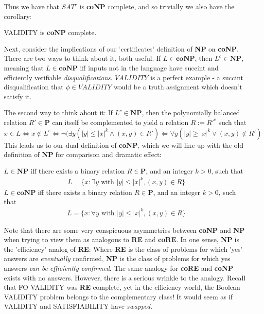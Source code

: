 Thus we have that $SAT^c$ is \textbf{coNP} complete, and so trivially we also have the corollary:
\begin{corollary}
    VALIDITY is \textbf{coNP} complete.
\end{corollary}
Next, consider the implications of our 'certificates' definition of \textbf{NP} on \textbf{coNP}. There are two ways to think about it, both useful. If $L \in \textbf{coNP}$, then $L^c \in \textbf{NP}$, meaning that $L \in \textbf{coNP}$ iff inputs not in the language have succint and efficiently verifiable \textit{disqualifications}. $VALIDITY$ is a perfect example - a succint disqualification that $\phi \in VALIDITY$ would be a truth assignment which doesn't satisfy it. 
\par The second way to think about it: If $L^c \in \textbf{NP}$, then the polynomially balanced relation $R' \in \textbf{P}$ can itself be complemented to yield a relation $R := R'^c$ such that
\[x \in L \iff x \notin L^c \iff \neg(\exists y(|y| \leq |x|^k \wedge (x,y) \in R')
    \iff \forall y(|y| \geq |x|^k \vee (x,y) \notin R')\]
This leads us to our dual definition of \textbf{coNP}, which we will line up with the old definition of \textbf{NP} for comparison and dramatic effect:
\begin{center}
    $L \in \textbf{NP}$ iff there exists a binary relation $R \in \textbf{P}$, and an integer $k>0$, such that
    \begin{align}
        L = \{x: \exists y \textrm{ with } |y| \leq |x|^k, (x,y) \in R \}
    \end{align}
    $L \in \textbf{coNP}$ iff there exists a binary relation $R \in \textbf{P}$, and an integer $k>0$, such that
    \begin{align}
        L = \{x: \forall y \textrm{ with } |y| \leq |x|^k, (x,y) \in R \} 
    \end{align}
\end{center}
Note that there are some very conspicuous asymmetries between \textbf{coNP} and \textbf{NP} when trying to view them as analogous to \textbf{RE} and \textbf{coRE}. In one sense, \textbf{NP} is the 'efficiency' analog of \textbf{RE}: Where \textbf{RE} is the class of problems for which 'yes' answers are \textit{eventually} confirmed, \textbf{NP} is the class of problems for which yes answers \textit{can be efficiently confirmed}. The same analogy for \textbf{coRE} and \textbf{coNP} exists with no answers. However, there is a serious wrinkle to the analogy. Recall that FO-VALIDITY was \textbf{RE}-complete, yet in the efficiency world, the Boolean VALIDITY problem belongs to the complementary class! It would seem as if VALIDITY and SATISFIABILITY have \textit{swapped}. 

